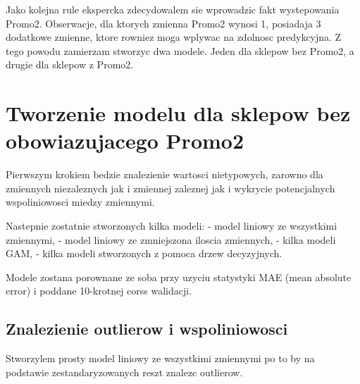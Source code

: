 \documentclass[]{article}
\newenvironment{Shaded}{\begin{snugshade}}{\end{snugshade}}
\newcommand{\DecValTok}[1]{\textcolor[rgb]{0.00,0.00,0.81}{#1}}
\newcommand{\KeywordTok}[1]{\textcolor[rgb]{0.13,0.29,0.53}{\textbf{#1}}}
\newcommand{\NormalTok}[1]{#1}
\newcommand{\OperatorTok}[1]{\textcolor[rgb]{0.81,0.36,0.00}{\textbf{#1}}}
\newcommand{\StringTok}[1]{\textcolor[rgb]{0.31,0.60,0.02}{#1}}
\begin{document}
Jako kolejna rule ekspercka zdecydowalem sie wprowadzic fakt
wystepowania Promo2. Obserwacje, dla ktorych zmienna Promo2 wynosi 1,
posiadaja 3 dodatkowe zmienne, ktore rowniez moga wplywac na zdolnosc
predykcyjna. Z tego powodu zamierzam stworzyc dwa modele. Jeden dla
sklepow bez Promo2, a drugie dla sklepow z Promo2.

\begin{Shaded}
\end{Shaded}

\hypertarget{tworzenie-modelu-dla-sklepow-bez-obowiazujacego-promo2}{%
\section{Tworzenie modelu dla sklepow bez obowiazujacego
Promo2}\label{tworzenie-modelu-dla-sklepow-bez-obowiazujacego-promo2}}

Pierwszym krokiem bedzie znalezienie wartosci nietypowych, zarowno dla
zmiennych niezaleznych jak i zmiennej zaleznej jak i wykrycie
potencjalnych wspoliniowosci miedzy zmiennymi.

Nastepnie zostatnie stworzonych kilka modeli: - model liniowy ze
wszystkimi zmiennymi, - model liniowy ze zmniejszona iloscia zmiennych,
- kilka modeli GAM, - kilka modeli stworzonych z pomoca drzew
decyzyjnych.

Modele zostana porownane ze soba przy uzyciu statystyki MAE (mean
absolute error) i poddane 10-krotnej corss walidacji.

\hypertarget{znalezienie-outlierow-i-wspoliniowosci}{%
\subsection{Znalezienie outlierow i
wspoliniowosci}\label{znalezienie-outlierow-i-wspoliniowosci}}

Stworzylem prosty model liniowy ze wszystkimi zmiennymi po to by na
podstawie zestandaryzowanych reszt znalezc outlierow.
\end{document}
